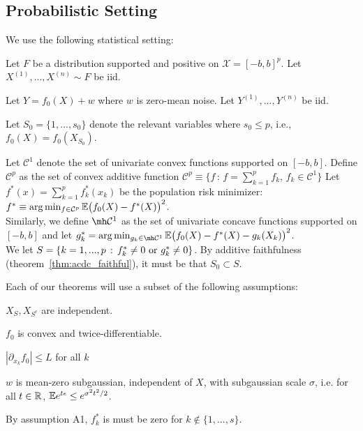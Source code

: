 \subsection{Probabilistic Setting}

We use the following statistical setting:

\begin{packed_enum}
\item Let $F$ be a distribution supported and positive on $\mathcal{X}=[-b,b]^p$. Let $X^{(1)},..., X^{(n)} \sim F$ be iid.
\item Let $Y = f_0(X) + w$ where $w$ is zero-mean noise. Let $Y^{(1)},...,Y^{(n)}$ be iid.
\item Let $S_0 = \{1,...,s_0\}$ denote the relevant variables where $s_0 \leq p$, i.e.,
  $f_0(X) = f_0(X_{S_0})$.
\end{packed_enum}


Let $\mathcal{C}^1$ denote the set of univariate convex functions supported on $[-b,b]$. Define $\mathcal{C}^{p}$ as the set of convex additive function
$\mathcal{C}^p \equiv \{ f \,:\, f = \sum_{k=1}^p f_k, \,
   f_k \in \mathcal{C}^1 \} $
Let $f^*(x) = \sum_{k=1}^p f^*_k(x_k)$ be the population risk minimizer:
$f^* \equiv \arg\min_{f \in \mathcal{C}^p} {\mathbb E}\big(f_0(X) - f^*(X) \big)^2$.\\

Similarly, we define $\mh \mathcal{C}^1$ as the set of univariate concave functions supported on $[-b, b]$ and let 
$g^*_k = \arg\min_{g_k \in \mh \mathcal{C}^1} \E \big( f_0(X) - f^*(X) - g_k(X_k) \big)^2$. \\

We let $S = \{ k = 1,...,p \,:\, f^*_k \neq 0 \textrm{ or } g^*_k \neq 0\}$. By additive faithfulness (theorem~\ref{thm:acdc_faithful}), it must be that $S_0 \subset S$. 


Each of our theorems will use a subset of the following assumptions:
\begin{packed_enum}
\item[A1:] $X_S, X_{S^c}$ are independent. 
\item[A2:] $f_0$ is convex and twice-differentiable. 
\item[A3:] $|\partial_{x_k} f_0 | \leq L$ for all $k$
\item[A4:] $w$ is mean-zero subgaussian, independent of $X$, with subgaussian scale $\sigma$, i.e. for all $t \in {\mathbb R}$, ${\mathbb E} e^{t \epsilon} \leq e^{\sigma^2 t^2 / 2}$.
\end{packed_enum}
By assumption A1, $f^*_k$ is must be zero for $k\notin \{1,...,s\}$. 


